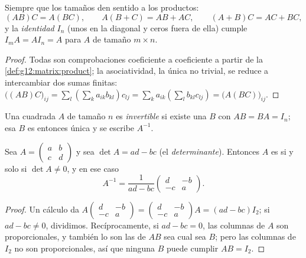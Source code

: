 \begin{proposition}\label{prop:g12:matrix:rules}
Siempre que los tamaños den sentido a los productos:
\[
(AB)C = A(BC), \qquad A(B + C) = AB + AC, \qquad (A+B)C = AC + BC,
\]
y la \emph{ identidad} $I_n$ (unos en la diagonal y ceros fuera de
ella) cumple $I_m A = A I_n = A$ para $A$ de tamaño $m \times n$.
\end{proposition}

\begin{proof}
Todas son comprobaciones coeficiente a coeficiente a partir de la
\cref{def:g12:matrix:product}; la asociatividad, la única no trivial, se
reduce a intercambiar dos sumas finitas:
$\bigl((AB)C\bigr)_{ij} = \sum_l \left(\sum_k a_{ik}b_{kl}\right) c_{lj}
= \sum_k a_{ik} \left(\sum_l b_{kl} c_{lj}\right)
= \bigl(A(BC)\bigr)_{ij}$.
\end{proof}

\begin{definition}[Inversa]\label{def:g12:matrix:inverse}
Una  cuadrada $A$ de tamaño $n$ es
\emph{invertible} si existe una  $B$ con
$AB = BA = I_n$; esa $B$ es entonces única y se escribe $A^{-1}$.
\end{definition}

\begin{proposition}\label{prop:g12:matrix:inverse2x2}
Sea $A = \begin{pmatrix} a & b\\ c & d\end{pmatrix}$ y sea
$\det A = ad - bc$ (el \emph{determinante}). Entonces
$A$ es  si y solo si $\det A \neq 0$, y en ese caso
\[
A^{-1} = \frac{1}{ad - bc}\begin{pmatrix} d & -b\\ -c & a\end{pmatrix}.
\]
\end{proposition}

\begin{proof}
Un cálculo da
$A \begin{pmatrix} d & -b\\ -c & a\end{pmatrix}
= \begin{pmatrix} d & -b\\ -c & a\end{pmatrix} A = (ad - bc) I_2$; si
$ad - bc \neq 0$, dividimos. Recíprocamente, si $ad - bc = 0$, las columnas
de $A$ son proporcionales, y también lo son las de $AB$ sea cual sea $B$;
pero las columnas de $I_2$ no son proporcionales, así que ninguna $B$ puede
cumplir $AB = I_2$.
\end{proof}

